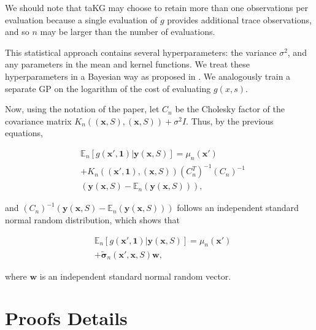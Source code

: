 \documentclass[letterpaper]{article}
\newcommand{\E}{\mathbb{E}}
\newcommand{\pfcomment}[1]{{\color{blue} PF: #1}}
\newcommand{\x}{\mathbf{x}}
\newcommand{\Y}{\mathbf{y}}
\renewcommand{\S}{S}
\newcommand{\w}{\mathbf{w}}
\newcommand{\chol}{C}
\newcommand{\sigmatilde}{\tilde{\mathbf{\sigma}}}
\newcommand{\one}{\mathbf{1}}
\newcommand{\xS}{(\x,\S)} %
\theoremstyle{definition}
\numberwithin{equation}{section}
\begin{document}
We should note that taKG may choose to retain more than one observations per evaluation because a single evaluation of $g$ provides additional trace observations, and so $n$ may be larger than the number of evaluations.


This statistical approach contains several hyperparameters: the variance $\sigma^2$, and any parameters in the mean and kernel functions.  We treat these hyperparameters in a Bayesian way as proposed in \citet{snoek2012practical}. We analogously train a separate GP on the logarithm of the cost of evaluating $g(x,s)$. 


Now, using the notation of the paper, let $\chol_{n}$ be the Cholesky factor of the covariance matrix  $K_n\left(\xS, \xS \right)+\sigma^2 I$. Thus, by the previous equations,

\begin{equation}
\begin{split}
&\E_n[g(\x',\one) | \Y(\x,\S)] = \mu_{n}(\x') \\
&+ K_{n}((\x', \one),\xS)
(\chol_{n}^T)^{-1}(\chol_{n})^{-1}\\
& (\Y(\x,\S)-\E_n(\Y(\x,\S))),
 \end{split}
\label{eq:variance}
\end{equation}

and $(\chol_{n})^{-1}(\Y(\x,\S)-\E_n(\Y(\x,\S)))$ follows an independent standard normal random distribution, which shows that

\begin{equation}
\begin{split}
&\E_n[g(\x',\one) | \Y(\x,\S)] = \mu_{n}(\x') \\
&+ \sigmatilde_n(\x',\x,\S)\w,
\end{split}
\end{equation}

where $\w$ is an independent standard normal random vector.


\section{Proofs Details}
\end{document}
